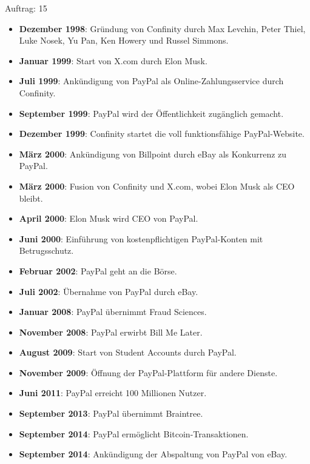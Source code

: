\documentclass[10pt]{article}
\begin{document}
\begin{description}
    \item[Auftrag: 15]
\end{description}


\begin{itemize}[label=\textbullet]
    \item \textbf{Dezember 1998}: Gründung von Confinity durch Max Levchin, Peter Thiel, Luke Nosek, Yu Pan, Ken Howery und Russel Simmons.    
    \item \textbf{Januar 1999}: Start von X.com durch Elon Musk.    
    \item \textbf{Juli 1999}: Ankündigung von PayPal als Online-Zahlungsservice durch Confinity.    
    \item \textbf{September 1999}: PayPal wird der Öffentlichkeit zugänglich gemacht.   
    \item \textbf{Dezember 1999}: Confinity startet die voll funktionsfähige PayPal-Website.    
    \item \textbf{März 2000}: Ankündigung von Billpoint durch eBay als Konkurrenz zu PayPal.    
    \item \textbf{März 2000}: Fusion von Confinity und X.com, wobei Elon Musk als CEO bleibt.    
    \item \textbf{April 2000}: Elon Musk wird CEO von PayPal.    
    \item \textbf{Juni 2000}: Einführung von kostenpflichtigen PayPal-Konten mit Betrugsschutz.    
    \item \textbf{Februar 2002}: PayPal geht an die Börse.    
    \item \textbf{Juli 2002}: Übernahme von PayPal durch eBay.    
    \item \textbf{Januar 2008}: PayPal übernimmt Fraud Sciences.    
    \item \textbf{November 2008}: PayPal erwirbt Bill Me Later.    
    \item \textbf{August 2009}: Start von Student Accounts durch PayPal.    
    \item \textbf{November 2009}: Öffnung der PayPal-Plattform für andere Dienste.    
    \item \textbf{Juni 2011}: PayPal erreicht 100 Millionen Nutzer.    
    \item \textbf{September 2013}: PayPal übernimmt Braintree.    
    \item \textbf{September 2014}: PayPal ermöglicht Bitcoin-Transaktionen.    
    \item \textbf{September 2014}: Ankündigung der Abspaltung von PayPal von eBay.    

\end{itemize}
\end{document}
